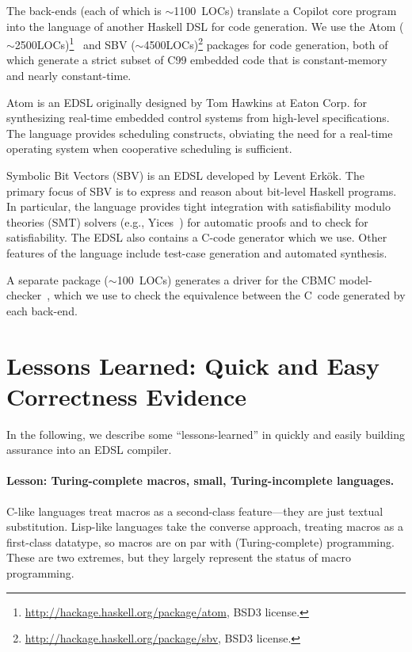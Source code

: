 \documentclass[preprint]{sigplanconf}
\begin{document}
The back-ends (each of which is $\sim$1100~LOCs) translate a Copilot core
program into the language of another Haskell DSL for code generation.  We use
the Atom
($\sim$2500LOCs)\footnote{\url{http://hackage.haskell.org/package/atom}, BSD3
  license.}~\cite{atom} and SBV
($\sim$4500LOCs)\footnote{\url{http://hackage.haskell.org/package/sbv}, BSD3
  license.} packages for code generation, both of which generate a strict subset
of C99 embedded code that is constant-memory and nearly constant-time.

Atom is an EDSL originally designed by Tom Hawkins at Eaton Corp. for
synthesizing real-time embedded control systems from high-level specifications.
The language provides scheduling constructs, obviating the need for a real-time
operating system when cooperative scheduling is sufficient.  

Symbolic Bit Vectors (SBV) is an EDSL developed by Levent Erk\"{o}k.  The
primary focus of SBV is to express and reason about bit-level Haskell programs.
In particular, the language provides tight integration with satisfiability
modulo theories (SMT) solvers (e.g., Yices~\cite{dutertre}) for automatic proofs and to
check for satisfiability.  The EDSL also contains a C-code generator which we
use.  Other features of the language include test-case generation and automated
synthesis.

A separate package ($\sim$100~LOCs) generates a driver for the CBMC
model-checker~\cite{cbmc}, which we use to check the equivalence between the C~code
generated by each back-end.

\section{Lessons Learned: Quick and Easy Correctness Evidence}
\label{sec:lessons}

In the following, we describe some ``lessons-learned'' in quickly and easily
building assurance into an EDSL compiler.






\paragraph{Lesson: Turing-complete macros, small, Turing-incomplete languages.}
\label{sec:turing}
C-like languages treat macros as a second-class feature---they are just textual
substitution.  Lisp-like languages take the converse approach, treating macros
as a first-class datatype, so macros are on par with (Turing-complete)
programming.  These are two extremes, but they largely represent the status
of macro programming.
\end{document}
